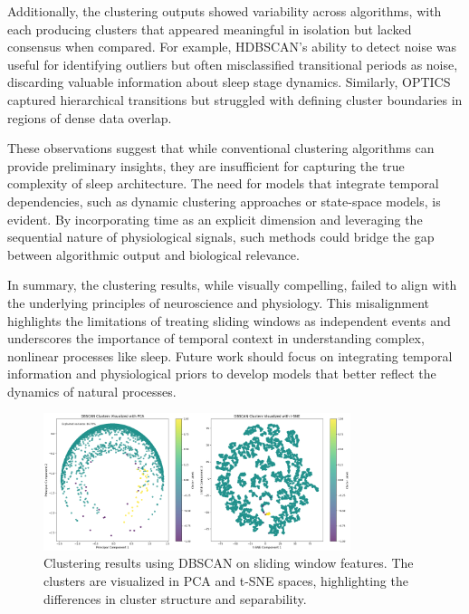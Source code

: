 \documentclass[a4paper,12pt,twoside]{article}
\begin{document}
Additionally, the clustering outputs showed variability across algorithms, with each producing clusters that appeared meaningful in isolation but lacked consensus when compared. For example, HDBSCAN’s ability to detect noise was useful for identifying outliers but often misclassified transitional periods as noise, discarding valuable information about sleep stage dynamics. Similarly, OPTICS captured hierarchical transitions but struggled with defining cluster boundaries in regions of dense data overlap.

These observations suggest that while conventional clustering algorithms can provide preliminary insights, they are insufficient for capturing the true complexity of sleep architecture. The need for models that integrate temporal dependencies, such as dynamic clustering approaches or state-space models, is evident. By incorporating time as an explicit dimension and leveraging the sequential nature of physiological signals, such methods could bridge the gap between algorithmic output and biological relevance.

In summary, the clustering results, while visually compelling, failed to align with the underlying principles of neuroscience and physiology. This misalignment highlights the limitations of treating sliding windows as independent events and underscores the importance of temporal context in understanding complex, nonlinear processes like sleep. Future work should focus on integrating temporal information and physiological priors to develop models that better reflect the dynamics of natural processes.

\begin{figure}[H]
    \centering
    \includegraphics[width=0.8\textwidth]{img/dbscan.png}
    \caption{Clustering results using DBSCAN on sliding window features. The clusters are visualized in PCA and t-SNE spaces, highlighting the differences in cluster structure and separability.}
    \label{fig:dbscan_clustering}
\end{figure}
\end{document}

